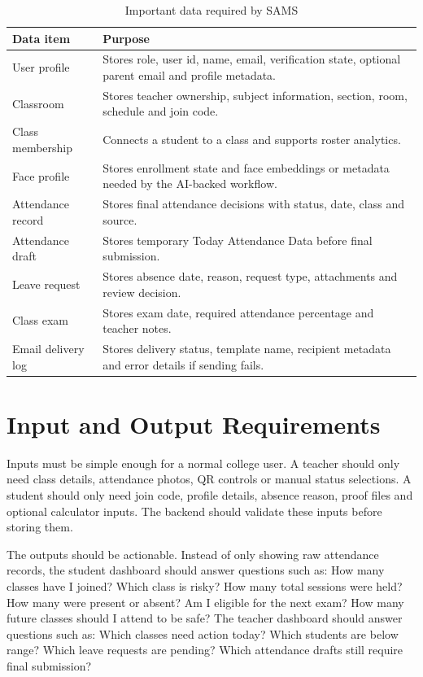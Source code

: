 \begin{table}[H]
\centering
\caption{Important data required by SAMS}
\label{tab:data-requirements}
\begin{tabularx}{\textwidth}{p{3.5cm} X}
\toprule
\textbf{Data item} & \textbf{Purpose}\\
\midrule
User profile & Stores role, user id, name, email, verification state, optional parent email and profile metadata.\\
Classroom & Stores teacher ownership, subject information, section, room, schedule and join code.\\
Class membership & Connects a student to a class and supports roster analytics.\\
Face profile & Stores enrollment state and face embeddings or metadata needed by the AI-backed workflow.\\
Attendance record & Stores final attendance decisions with status, date, class and source.\\
Attendance draft & Stores temporary Today Attendance Data before final submission.\\
Leave request & Stores absence date, reason, request type, attachments and review decision.\\
Class exam & Stores exam date, required attendance percentage and teacher notes.\\
Email delivery log & Stores delivery status, template name, recipient metadata and error details if sending fails.\\
\bottomrule
\end{tabularx}
\end{table}

\section{Input and Output Requirements}

Inputs must be simple enough for a normal college user. A teacher should only need class details, attendance photos, QR controls or manual status selections. A student should only need join code, profile details, absence reason, proof files and optional calculator inputs. The backend should validate these inputs before storing them.

The outputs should be actionable. Instead of only showing raw attendance records, the student dashboard should answer questions such as: How many classes have I joined? Which class is risky? How many total sessions were held? How many were present or absent? Am I eligible for the next exam? How many future classes should I attend to be safe? The teacher dashboard should answer questions such as: Which classes need action today? Which students are below range? Which leave requests are pending? Which attendance drafts still require final submission?

